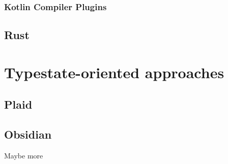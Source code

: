 \subsubsection*{Kotlin Compiler Plugins}\label{sec:lang-preprocessors:kotlin:annotation}

\subsection{Rust}\label{sec:lang-preprocessors:rust}


\section{Typestate-oriented approaches}
\subsection{Plaid}
\subsection{Obsidian}
Maybe more